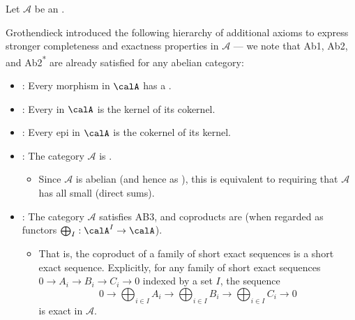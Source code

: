 \begin{definition} \label{definition:grothendiecks_additional_axioms_for_abelian_categories}
Let $\mathcal{A}$ be an .

Grothendieck introduced the following hierarchy of additional axioms to express stronger completeness and exactness properties in $\mathcal{A}$ --- we note that Ab1, Ab2, and Ab2\textsuperscript{*} are already satisfied for any abelian category:

\begin{itemize}

  \item {}: Every morphism in $\calA$ has a .
  \item {}: Every  in $\calA$ is the kernel of its cokernel. 
  \item {}: Every epi in $\calA$ is the cokernel of its kernel. 

  \item {}: The category $\mathcal{A}$ is .
  \begin{itemize}
    \item Since $\mathcal{A}$ is abelian (and hence   as ), this is equivalent to requiring that $\mathcal{A}$ has all small  (direct sums).
  \end{itemize}

  \item {}: The category $\mathcal{A}$ satisfies AB3, and coproducts are  (when regarded as functors $\bigoplus_I: \calA^I \to \calA$).
  \begin{itemize}
    \item That is, the coproduct of a family of short exact sequences is a short exact sequence. Explicitly, for any family of short exact sequences $0 \to A_i \to B_i \to C_i \to 0$ indexed by a set $I$, the sequence
    \[ 0 \to \bigoplus_{i \in I} A_i \to \bigoplus_{i \in I} B_i \to \bigoplus_{i \in I} C_i \to 0 \]
    is exact in $\mathcal{A}$.
  \end{itemize}


\end{itemize}
\end{definition}
